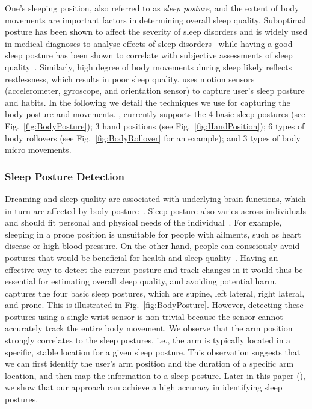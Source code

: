 One's sleeping position, also referred to as {\em sleep posture}, and the extent of body movements are important factors in determining overall sleep quality. Suboptimal posture has been shown to affect the severity of sleep disorders and is widely used in medical diagnoses to analyse effects of sleep disorders~\cite{oksenberg1998effect,eiseman2012impact} while having a good sleep posture has been shown to correlate with subjective assessments of sleep quality~\cite{dekoninck83sleep}. Similarly, high degree of body movements during sleep likely reflects restlessness, which results in poor sleep quality. {\systemname} uses motion sensors (accelerometer, gyroscope, and orientation sensor) to capture user's sleep posture and habits. In the following we detail the techniques we use for capturing the body posture and movements.  {\systemname}, currently supports the 4 basic sleep postures (see Fig.~\ref{fig:BodyPosture}); 3 hand positions (see Fig.~\ref{fig:HandPosition}); 6 types of body rollovers (see Fig.~\ref{fig:BodyRollover} for an example); and 3 types of body micro movements. %


\subsubsection{Sleep Posture Detection \label{sec:sleeppdet}}

Dreaming and sleep quality are associated with underlying brain functions, which in turn are affected by body posture~\cite{posture2004}.
Sleep posture also varies across individuals and should fit personal and physical needs of the individual~\cite{posture2016,posture2017}.
For example, sleeping in a prone position is unsuitable for people with ailments, such as heart disease or high blood pressure. On the
other hand, people can consciously avoid postures that would be beneficial for health and sleep quality~\cite{posture2015}. Having an
effective way to detect the current posture and track changes in it would thus be essential for estimating overall sleep quality, and
avoiding potential harm. \systemname captures the four basic sleep postures, which are supine, left lateral, right lateral, and prone. This
is illustrated in Fig.~\ref{fig:BodyPosture}. However, detecting these postures using a single wrist sensor is non-trivial because the
sensor cannot accurately track the entire body movement. We observe that the arm position strongly correlates to the sleep postures, i.e.,
the arm is typically located in a specific, stable location for a given sleep posture. This observation suggests that we can first identify
the user's arm position and the duration of a specific arm location, and then map the information to a sleep posture. Later in this paper
(), we show that our approach can achieve a high accuracy in identifying sleep postures.




